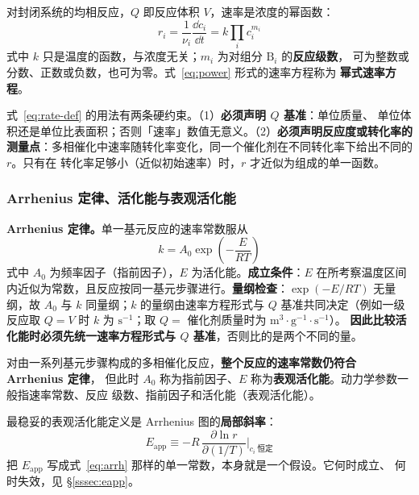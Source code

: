 对封闭系统的均相反应，$Q$ 即反应体积 $V$，速率是浓度的幂函数：
\begin{equation}
r_i=\frac{1}{\nu_i}\frac{\dd c_i}{\dd t}=k\prod_i c_i^{m_i}
\label{eq:power}
\end{equation}
式中 $k$ 只是温度的函数，与浓度无关；$m_i$ 为对组分 $\mathrm{B}_i$ 的\textbf{反应级数}，
可为整数或分数、正数或负数，也可为零。式~\eqref{eq:power} 形式的速率方程称为
\textbf{幂式速率方程}。

\begin{keycond}
式~\eqref{eq:rate-def} 的用法有两条硬约束。（1）\textbf{必须声明 $Q$ 基准}：单位质量、
单位体积还是单位比表面积；否则「速率」数值无意义。（2）\textbf{必须声明反应度或转化率的
测量点}：多相催化中速率随转化率变化，同一个催化剂在不同转化率下给出不同的 $r$。只有在
转化率足够小（近似初始速率）时，$r$ 才近似为组成的单一函数。
\end{keycond}

\subsubsection{Arrhenius 定律、活化能与表观活化能}

\begin{principle}
\textbf{Arrhenius 定律。}单一基元反应的速率常数服从
\begin{equation}
k=A_0\exp\!\left(-\frac{E}{RT}\right)
\label{eq:arrh}
\end{equation}
式中 $A_0$ 为频率因子（指前因子），$E$ 为活化能。\textbf{成立条件}：$E$ 在所考察温度区间
内近似为常数，且反应按同一基元步骤进行。\textbf{量纲检查}：$\exp(-E/RT)$ 无量纲，故 $A_0$
与 $k$ 同量纲；$k$ 的量纲由速率方程形式与 $Q$ 基准共同决定（例如一级反应取 $Q=V$ 时
$k$ 为 $\mathrm{s^{-1}}$；取 $Q=$ 催化剂质量时为 $\mathrm{m^3{\cdot}g^{-1}{\cdot}s^{-1}}$）。
\textbf{因此比较活化能时必须先统一速率方程形式与 $Q$ 基准}，否则比的是两个不同的量。
\end{principle}

对由一系列基元步骤构成的多相催化反应，\textbf{整个反应的速率常数仍符合 Arrhenius 定律}，
但此时 $A_0$ 称为指前因子、$E$ 称为\textbf{表观活化能}。动力学参数一般指速率常数、反应
级数、指前因子和活化能（表观活化能）。

最稳妥的表观活化能定义是 Arrhenius 图的\textbf{局部斜率}：
\begin{equation}
E_{\mathrm{app}}\equiv -R\,\frac{\partial \ln r}{\partial (1/T)}\Bigg|_{c_i\ \text{恒定}}
\label{eq:eapp-def}
\end{equation}
把 $E_{\mathrm{app}}$ 写成式~\eqref{eq:arrh} 那样的单一常数，本身就是一个假设。它何时成立、
何时失效，见 §\ref{sssec:eapp}。


